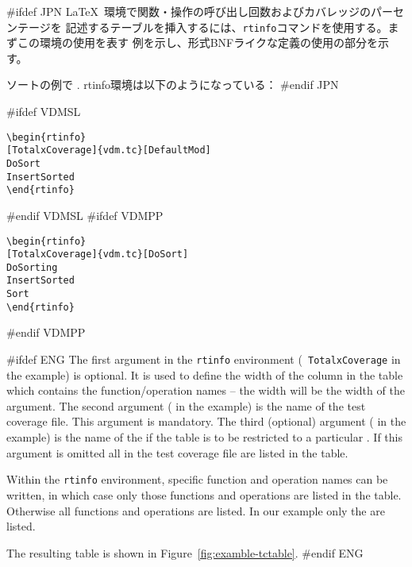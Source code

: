 \documentclass[\pformat,12pt]{article}
\begin{document}
#ifdef JPN
\LaTeX\ 環境で関数・操作の呼び出し回数およびカバレッジのパーセンテージを
記述するテーブルを挿入するには、{\tt rtinfo}コマンドを使用する。まずこの環境の使用を表す
例を示し、形式BNFライクな定義の使用の部分を示す。
  
ソートの例で
.
rtinfo環境は以下のようになっている：
#endif JPN

#ifdef VDMSL
\begin{verbatim}
\begin{rtinfo}
[TotalxCoverage]{vdm.tc}[DefaultMod]
DoSort
InsertSorted
\end{rtinfo}
\end{verbatim}
#endif VDMSL
#ifdef VDMPP
\begin{verbatim}
\begin{rtinfo}
[TotalxCoverage]{vdm.tc}[DoSort]
DoSorting
InsertSorted
Sort
\end{rtinfo}
\end{verbatim}
#endif VDMPP

#ifdef ENG
The first argument in the {\tt rtinfo} environment ({\tt
  TotalxCoverage} in the example) is optional. 
It is used to define the width of the column in the table which
contains the function/operation names -- the width will be the width
of the argument.  The second argument
( in the example) is the  
name of the test coverage file.  This argument is mandatory.  The third
(optional) argument ( in the example) is the name of the
 if the table is to be
restricted to a  particular
. If this argument is
omitted all  in the test
coverage file are listed in the table.

Within the {\tt rtinfo} environment, specific function and
operation names can be written, in which case only those
functions and operations are listed in the table. Otherwise all
functions and operations are listed.  In our example only the 
 are listed.

The resulting table is shown in Figure~\ref{fig:examble-tctable}.
#endif ENG
\end{document}
